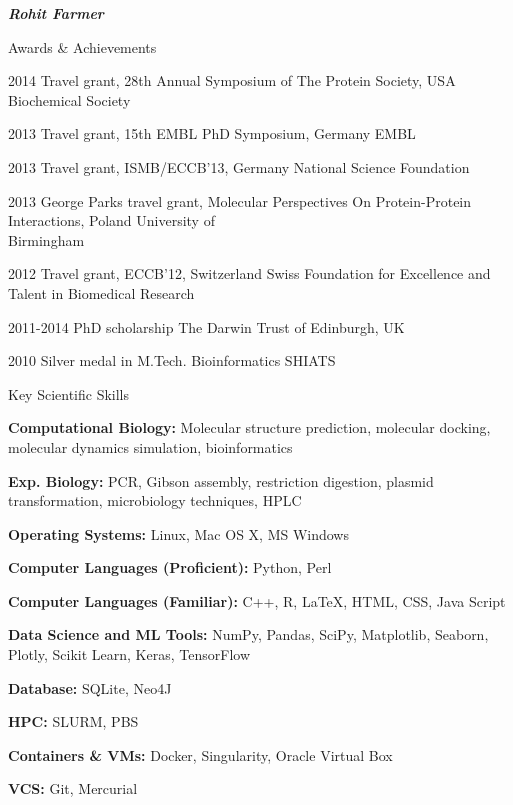 \documentclass[10pt]{article}
\begin{document}
\begin{cv}{\huge \it \bfseries Rohit Farmer}
\newpage
\begin{cvlist}{Awards \& Achievements}
	\item[2014] Travel grant, 28th Annual Symposium of The Protein Society, USA \hfill Biochemical Society
	\item[2013] Travel grant, 15th EMBL PhD Symposium, Germany \hfill EMBL
	\item[2013] Travel grant, ISMB/ECCB'13, Germany \hfill National Science Foundation
	\item[2013] George Parks travel grant,  Molecular Perspectives On Protein-Protein Interactions, Poland \hfill University of \\ \hspace*{\fill} Birmingham
	\item[2012] Travel grant, ECCB’12, Switzerland \hfill Swiss Foundation for Excellence and \\ \hspace*{\fill} Talent in Biomedical Research
	\item[2011-2014] PhD scholarship \hfill The Darwin Trust of Edinburgh, UK
	\item[2010] Silver medal in M.Tech. Bioinformatics \hfill SHIATS
\end{cvlist}

\vskip3pt
\begin{cvlist}{Key Scientific Skills}
	\item[\textbf{Computational Biology:}] Molecular structure prediction,	molecular docking, molecular dynamics simulation, bioinformatics
	\item[\textbf{Exp. Biology:}] PCR, Gibson assembly, restriction digestion, plasmid transformation, microbiology techniques, 
	HPLC
	\item[\textbf{Operating Systems:}] Linux, Mac OS X, MS Windows
	\item[\textbf{Computer Languages (Proficient):}] Python, Perl
	\item[\textbf{Computer Languages (Familiar):}] C++, R, \LaTeX, HTML, CSS, Java Script
	\item[\textbf{Data Science and ML Tools:}] NumPy, Pandas, SciPy, Matplotlib, Seaborn, Plotly, Scikit Learn, Keras, TensorFlow
	\item[\textbf{Database:}] SQLite, Neo4J
	\item[\textbf{HPC:}] SLURM, PBS
	\item[\textbf{Containers \& VMs:}] Docker, Singularity, Oracle Virtual Box
	\item[\textbf{VCS:}] Git, Mercurial
\end{cvlist}


\end{cv}
\end{document}
